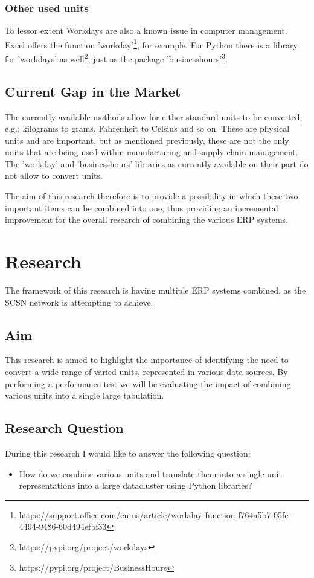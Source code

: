 \documentclass[sigchi, nonacm]{acmart}
\begin{document}
\subsubsection{Other used units}
To lessor extent Workdays are also a known issue in computer management. Excel offers the function 'workday'\footnote{https://support.office.com/en-us/article/workday-function-f764a5b7-05fc-4494-9486-60d494efbf33}, for example. For Python there is a library for 'workdays' as well\footnote{https://pypi.org/project/workdays}, just as the package 'businesshours'\footnote{https://pypi.org/project/BusinessHours}.

\subsection{Current Gap in the Market}
The currently available methods allow for either standard units to be converted, e.g.; kilograms to grams, Fahrenheit to Celsius and so on. These are physical units and are important, but as mentioned previously, these are not the only units that are being used within manufacturing and supply chain management.
The 'workday' and 'businesshours' libraries as currently available on their part do not allow to convert units. 

The aim of this research therefore is to provide a possibility in which these two important items can be combined into one, thus providing an incremental improvement for the overall research of combining the various ERP systems.



\section{Research}
The framework of this research is having multiple ERP systems combined, as the SCSN network is attempting to achieve.

\subsection{Aim}
This research is aimed to highlight the importance of identifying the need to convert a wide range of varied units, represented in various data sources. By performing a performance test we will be evaluating the impact of combining various units into a single large tabulation.

\subsection{Research Question}
During this research I would like to answer the following question:
\begin{itemize}
    \item{How do we combine various units and translate them into a single unit representations into a large datacluster using Python libraries?}
\end{itemize}
\end{document}
